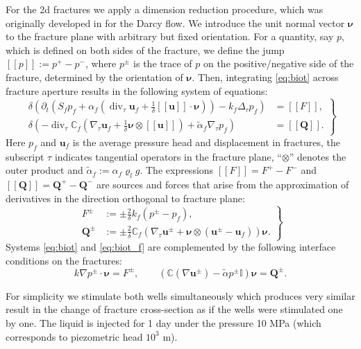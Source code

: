 \documentclass{article}
\newcommand{\CC}{\mathbb C}
\renewcommand{\div}{\operatorname{div}}
\newcommand{\eq}[1]{\begin{equation}#1\end{equation}}
\newcommand{\II}{\mathbb I}
\newcommand{\jmp}[1]{[\![#1]\!]}
\newcommand{\uu}{\vc u}
\newcommand{\vc}[1]{\boldsymbol{#1}}
\begin{document}
For the 2d fractures we apply a dimension reduction procedure, which was originally developed in \cite{martin_modeling_2005} for the Darcy flow.
We introduce the unit normal vector $\vc\nu$ to the fracture plane with arbitrary but fixed orientation.
For a quantity, say $p$, which is defined on both sides of the fracture, we define the jump $\jmp{p}:=p^+-p^-$, where $p^\pm$ is the trace of $p$ on the positive/negative side of the fracture, determined by the orientation of $\vc\nu$.
Then, integrating \eqref{eq:biot} across fracture aperture results in the following system of equations:
\eq{\label{eq:biot_f}\left.\begin{aligned}
\delta\left(\partial_t\left(S_fp_f + \alpha_f\left(\div_\tau\uu_f+\tfrac1\delta\jmp{\uu}\cdot\vc\nu\right)\right) - k_f\Delta_\tau p_f\right) &= \jmp{F}, \\
\delta\left(-\div_\tau\CC_f(\nabla_\tau\uu_f+\tfrac1\delta\vc\nu\otimes\jmp{\uu}) + \tilde\alpha_f\nabla_\tau p_f\right) &= \jmp{\vc Q}.
\end{aligned}\right\} }
Here $p_f$ and $\uu_f$ is the average pressure head and displacement in fractures, the subscript $\tau$ indicates tangential operators in the fracture plane, ``$\otimes$'' denotes the outer product and $\tilde\alpha_f:=\alpha_f\varrho_l g$.
The expressions $\jmp{F}=F^+-F^-$ and $\jmp{\vc Q}=\vc Q^+-\vc Q^-$ are sources and forces that arise from the approximation of derivatives in the direction orthogonal to fracture plane:
\eq{ \left.\begin{aligned}
F^\pm &:= \pm\frac2\delta k_f(p^\pm-p_f),\\
\vc Q^\pm &:= \pm\frac2\delta\CC_f(\nabla_\tau\uu^\pm + \vc\nu\otimes(\uu^\pm-\uu_f))\vc\nu. %
\end{aligned}\right\} }
Systems \eqref{eq:biot} and \eqref{eq:biot_f} are complemented by the following interface conditions on the fractures:
\eq{ k\nabla p^\pm\cdot\vc\nu = F^\pm,\qquad \left(\CC(\nabla\uu^\pm) - \tilde\alpha p^\pm\II\right)\vc\nu = \vc Q^\pm. }


For simplicity we stimulate both wells simultaneously which produces very similar result in the change of fracture cross-section as if the wells were stimulated one by one.
The liquid is injected for 1 day under the pressure 10 MPa (which corresponds to piezometric head $10^3$ m).
\end{document}
